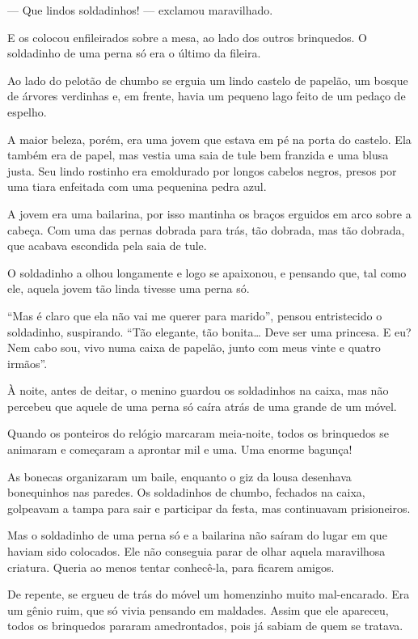\begin{conteudo}
\begin{conteudo}
\begin{conteudo}
\begin{conteudo}
\begin{conteudo}
\begin{myquote}
--- Que lindos soldadinhos! --- exclamou maravilhado.

E os colocou enfileirados sobre a mesa, ao lado dos outros brinquedos. O
soldadinho de uma perna só era o último da fileira.

Ao lado do pelotão de chumbo se erguia um lindo castelo de papelão, um
bosque de árvores verdinhas e, em frente, havia um pequeno lago feito de
um pedaço de espelho.

A maior beleza, porém, era uma jovem que estava em pé na porta do
castelo. Ela também era de papel, mas vestia uma saia de tule bem
franzida e uma blusa justa. Seu lindo rostinho era emoldurado por
longos cabelos negros, presos por uma tiara enfeitada com uma pequenina
pedra azul.

A jovem era uma bailarina, por isso mantinha os braços erguidos
em arco sobre a cabeça. Com uma das pernas dobrada para trás, tão
dobrada, mas tão dobrada, que acabava escondida pela saia de tule.

O soldadinho a olhou longamente e logo se apaixonou, e pensando que, tal
como ele, aquela jovem tão linda tivesse uma perna só.

``Mas é claro que ela não vai me querer para marido'', pensou
entristecido o soldadinho, suspirando. ``Tão elegante, tão
bonita\ldots{} Deve ser uma princesa. E eu? Nem cabo sou, vivo numa
caixa de papelão, junto com meus vinte e quatro irmãos''.

À noite, antes de deitar, o menino guardou os soldadinhos na caixa, mas
não percebeu que aquele de uma perna só caíra atrás de uma grande de um móvel.

Quando os ponteiros do relógio marcaram meia-noite, todos os brinquedos
se animaram e começaram a aprontar mil e uma. Uma enorme bagunça!

As bonecas organizaram um baile, enquanto o giz da lousa desenhava
bonequinhos nas paredes. Os soldadinhos de chumbo, fechados na caixa,
golpeavam a tampa para sair e participar da festa, mas continuavam prisioneiros.

Mas o soldadinho de uma perna só e a bailarina não saíram do lugar em
que haviam sido colocados. Ele não conseguia parar de olhar aquela
maravilhosa criatura. Queria ao menos tentar conhecê-la, para ficarem
amigos.

De repente, se ergueu de trás do móvel um homenzinho muito mal-encarado.
Era um gênio ruim, que só vivia pensando em maldades. Assim que ele
apareceu, todos os brinquedos pararam amedrontados, pois já sabiam de
quem se tratava.


\end{myquote}
\end{conteudo}
\end{conteudo}
\end{conteudo}
\end{conteudo}
\end{conteudo}
